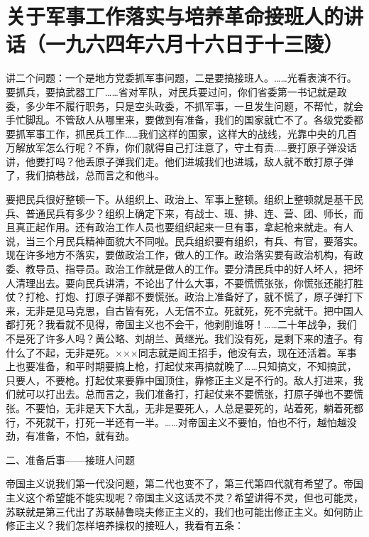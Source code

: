 \section[关于军事工作落实与培养革命接班人的讲话（一九六四年六月十六日于十三陵）]{关于军事工作落实与培养革命接班人的讲话（一九六四年六月十六日于十三陵）}


讲二个问题：一个是地方党委抓军事问题，二是要搞接班人。……光看表演不行。要抓兵，要搞武器工厂……省对军队，对民兵要过问，你们省委第一书记就是政委，多少年不履行职务，只是空头政委，不抓军事，一旦发生问题，不帮忙，就会手忙脚乱。不管敌人从哪里来，要做到有准备，我们的国家就亡不了。各级党委都要抓军事工作，抓民兵工作……我们这样的国家，这样大的战线，光靠中央的几百万解放军怎么行呢？不靠，你们就得自己打注意了，守土有责……要打原子弹没话讲，他要打吗？他丢原子弹我们走。他们进城我们也进城，敌人就不敢打原子弹了，我们搞巷战，总而言之和他斗。

要把民兵很好整顿一下。从组织上、政治上、军事上整顿。组织上整顿就是基干民兵、普通民兵有多少？组织上确定下来，有战士、班、排、连、营、团、师长，而且真正起作用。还有政治工作人员也要组织起来一旦有事，拿起枪来就走。有人说，当三个月民兵精神面貌大不同啦。民兵组织要有组织，有兵、有官，要落实。现在许多地方不落实，要做政治工作，做人的工作。政治落实要有政治机构，有政委、教导员、指导员。政治工作就是做人的工作。要分清民兵中的好人坏人，把坏人清理出去。要向民兵讲清，不论出了什么大事，不要慌慌张张，你慌张还能打胜仗？打枪、打炮、打原子弹都不要慌张。政治上准备好了，就不慌了，原子弹打下来，无非是见马克思，自古皆有死，人无信不立。死就死，死不完就干。把中国人都打死？我看就不见得，帝国主义也不会干，他剥削谁呀！……二十年战争，我们不是死了许多人吗？黄公略、刘胡兰、黄继光。我们没有死，是剩下来的渣子。有什么了不起，无非是死。×××同志就是阎王招手，他没有去，现在还活着。军事上也要准备，和平时期要搞上枪，打起仗来再搞就晚了……只知搞文，不知搞武，只要人，不要枪。打起仗来要靠中国顶住，靠修正主义是不行的。敌人打进来，我们就可以打出去。总而言之，我们准备打，打起仗来不要慌张，打原子弹也不要慌张。不要怕，无非是天下大乱，无非是要死人，人总是要死的，站着死，躺着死都行，不死就干，打死一半还有一半。……对帝国主义不要怕，怕也不行，越怕越没劲，有准备，不怕，就有劲。

二、准备后事——接班人问题

帝国主义说我们第一代没问题，第二代也变不了，第三代第四代就有希望了。帝国主义这个希望能不能实现呢？帝国主义这话灵不灵？希望讲得不灵，但也可能灵，苏联就是第三代出了苏联赫鲁晓夫修正主义的，我们也可能出修正主义。如何防止修正主义？我们怎样培养操权的接班人，我看有五条：

